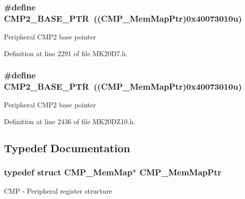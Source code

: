 \subsubsection[{\texorpdfstring{C\+M\+P2\+\_\+\+B\+A\+S\+E\+\_\+\+P\+TR}{CMP2_BASE_PTR}}]{\setlength{\rightskip}{0pt plus 5cm}\#define C\+M\+P2\+\_\+\+B\+A\+S\+E\+\_\+\+P\+TR~(({\bf C\+M\+P\+\_\+\+Mem\+Map\+Ptr})0x40073010u)}\hypertarget{group___c_m_p___peripheral_ga732cbf43f95d2d1cd01b4204263940ab}{}\label{group___c_m_p___peripheral_ga732cbf43f95d2d1cd01b4204263940ab}
Peripheral C\+M\+P2 base pointer 

Definition at line 2291 of file M\+K20\+D7.\+h.

\subsubsection[{\texorpdfstring{C\+M\+P2\+\_\+\+B\+A\+S\+E\+\_\+\+P\+TR}{CMP2_BASE_PTR}}]{\setlength{\rightskip}{0pt plus 5cm}\#define C\+M\+P2\+\_\+\+B\+A\+S\+E\+\_\+\+P\+TR~(({\bf C\+M\+P\+\_\+\+Mem\+Map\+Ptr})0x40073010u)}\hypertarget{group___c_m_p___peripheral_ga732cbf43f95d2d1cd01b4204263940ab}{}\label{group___c_m_p___peripheral_ga732cbf43f95d2d1cd01b4204263940ab}
Peripheral C\+M\+P2 base pointer 

Definition at line 2436 of file M\+K20\+D\+Z10.\+h.



\subsection{Typedef Documentation}
\subsubsection[{\texorpdfstring{C\+M\+P\+\_\+\+Mem\+Map\+Ptr}{CMP_MemMapPtr}}]{\setlength{\rightskip}{0pt plus 5cm}typedef struct {\bf C\+M\+P\+\_\+\+Mem\+Map}$\ast$ {\bf C\+M\+P\+\_\+\+Mem\+Map\+Ptr}}\hypertarget{group___c_m_p___peripheral_ga6f5d370df3839e41b771c2d0b89cbb83}{}\label{group___c_m_p___peripheral_ga6f5d370df3839e41b771c2d0b89cbb83}
C\+MP -\/ Peripheral register structure 
